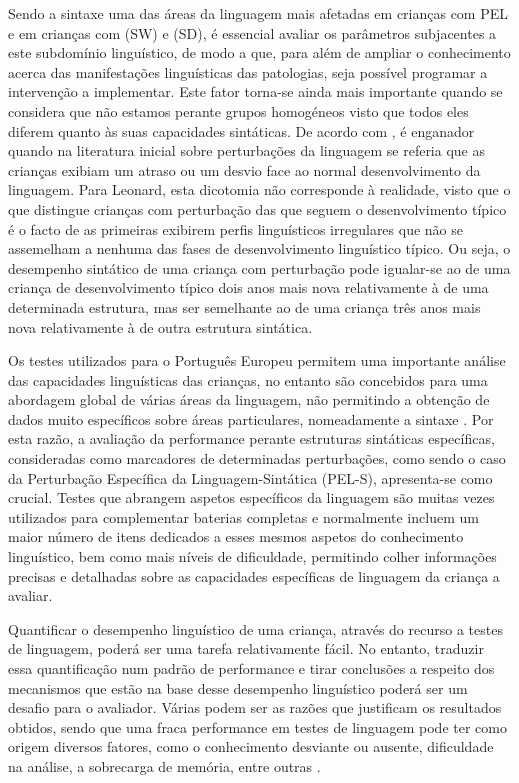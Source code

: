 \documentclass[output=paper]{LSP/langsci}
\begin{document}
Sendo a sintaxe uma das áreas da linguagem mais afetadas em crianças com PEL e em crianças com  (SW) e  (SD), é essencial avaliar os parâmetros subjacentes a este subdomínio linguístico, de modo a que, para além de ampliar o conhecimento acerca das manifestações linguísticas das patologias, seja possível programar a intervenção a implementar. Este fator torna-se ainda mais importante quando se considera que não estamos perante grupos homogéneos visto que todos eles diferem quanto às suas capacidades sintáticas. De acordo com \cite{leonard1998}, é enganador quando na literatura inicial sobre perturbações da linguagem se referia que as crianças exibiam um atraso ou um desvio face ao normal desenvolvimento da linguagem. Para Leonard, esta dicotomia não corresponde à realidade, visto que o que distingue crianças com perturbação das que seguem o desenvolvimento típico é o facto de as primeiras exibirem perfis linguísticos irregulares que não se assemelham a nenhuma das fases de desenvolvimento linguístico típico. Ou seja, o desempenho sintático de uma criança com perturbação pode igualar-se ao de uma criança de desenvolvimento típico dois anos mais nova relativamente à  de uma determinada estrutura, mas ser semelhante ao de uma criança três anos mais nova relativamente à  de outra estrutura sintática. 

Os testes utilizados para o Português Europeu permitem uma importante análise das capacidades linguísticas das crianças, no entanto são concebidos para uma abordagem global de várias áreas da linguagem, não permitindo a obtenção de dados muito específicos sobre áreas particulares, nomeadamente a sintaxe \citep{afonso_2011}. Por esta razão, a avaliação da performance perante estruturas sintáticas específicas, consideradas como marcadores de determinadas perturbações, como sendo o caso da Perturbação Específica da Linguagem-Sintática (PEL-S), apresenta-se como crucial. Testes que abrangem aspetos específicos da linguagem são muitas vezes utilizados para complementar baterias completas e normalmente incluem um maior número de itens dedicados a esses mesmos aspetos do conhecimento linguístico, bem como mais níveis de dificuldade, permitindo colher informações precisas e detalhadas sobre as capacidades específicas de linguagem da criança a avaliar. 

Quantificar o desempenho linguístico de uma criança, através do recurso a testes de linguagem, poderá ser uma tarefa relativamente fácil. No entanto, traduzir essa quantificação num padrão de performance e tirar conclusões a respeito dos mecanismos que estão na base desse desempenho linguístico poderá ser um desafio para o avaliador. Várias podem ser as razões que justificam os resultados obtidos, sendo que uma fraca performance em testes de linguagem pode ter como origem diversos fatores, como o conhecimento desviante ou ausente, dificuldade na análise, a sobrecarga de memória, entre outras \citep{crainthornton1998}. 
\end{document}
